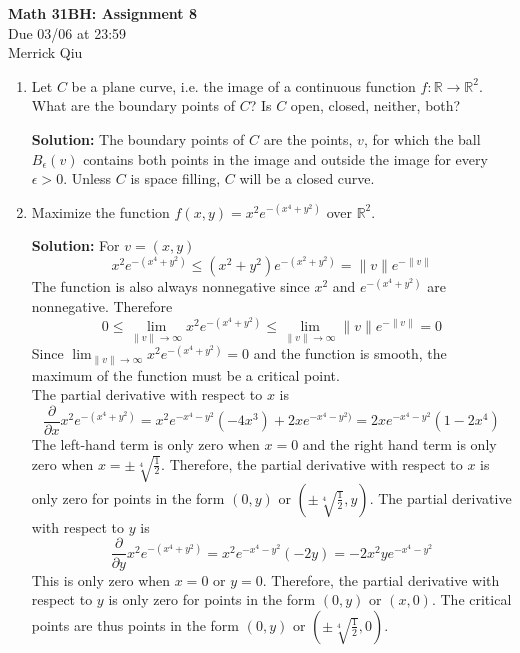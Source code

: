 \documentclass{report}
\newcommand{\solution}{\textbf{Solution: }}
\newcommand{\pdiv}[1]{\frac{\partial}{\partial #1}}
\begin{document}
\begin{center}
	\huge{\bf Math 31BH: Assignment 8} \\
	Due 03/06 at 23:59 \\ 
	Merrick Qiu
\end{center}

\bigskip

\begin{enumerate}

	\medskip
	\item
	Let $C$ be a plane curve, i.e. the image of a continuous function 
	$f \colon \mathbb{R} \to \mathbb{R}^2$. What are the boundary points of $C$?
	Is $C$ open, closed, neither, both?
	
	\solution 
	The boundary points of $C$ are the points, $v$, for which 
	the ball $B_\epsilon(v)$ contains both points in the image and outside the image 
	for every $\epsilon > 0$.
	Unless $C$ is space filling, $C$ will be a closed curve.
  
	\medskip
	\item
	Maximize the function $f(x,y) = x^2e^{-(x^4+y^2)}$ over $\mathbb{R}^2$.
	
	\solution 
	For $v = (x, y)$
	\[
		x^2e^{-(x^4+y^2)} \leq (x^2+y^2)e^{-(x^2+y^2)} = \|v\| e^{-\|v\|}
	\]
	The function is also always nonnegative 
	since $x^2$ and $e^{-(x^4+y^2)}$ are nonnegative.
	Therefore
	\[
		0 \leq 
		\lim_{\|v\| \to \infty} x^2e^{-(x^4+y^2)} \leq  
		\lim_{\|v\| \to \infty} \|v\| e^{-\|v\|} = 0
	\]
	Since $\lim_{\|v\| \to \infty} x^2e^{-(x^4+y^2)} = 0$ and the function is smooth,
	the maximum of the function must be a critical point. \\

	The partial derivative with respect to $x$ is
	\[
		\pdiv{x} x^2e^{-(x^4+y^2)} = 
		x^2 e^{-x^4-y^2} (-4x^3) + 2xe^{-x^4-y^2)} =
		2xe^{-x^4-y^2}(1-2x^4)
	\]
	The left-hand term is only zero when $x=0$ and 
	the right hand term is only zero when $x= \pm \sqrt[4]{\frac{1}{2}}$.
	Therefore, the partial derivative with respect to $x$ is only zero for 
	points in the form $(0, y)$ or $(\pm \sqrt[4]{\frac{1}{2}}, y)$.
	The partial derivative with respect to $y$ is
	\[
		\pdiv{y} x^2e^{-(x^4+y^2)} = 
		x^2e^{-x^4-y^2}(-2y) =
		-2x^2y e^{-x^4-y^2}
	\]
	This is only zero when $x=0$ or $y=0$.
	Therefore, the partial derivative with respect to $y$ is only zero for 
	points in the form $(0, y)$ or $(x, 0)$. 
	The critical points are thus points in the form 
	$(0, y)$ or  $(\pm \sqrt[4]{\frac{1}{2}}, 0)$.


\end{enumerate}
\end{document}
